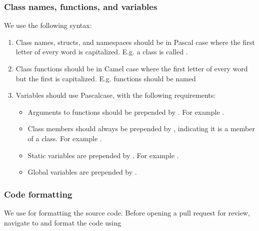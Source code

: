 \documentclass[letterpaper,10pt,english]{sphinxmanual}
\begin{document}
\subsubsection{Class names, functions, and variables}
\label{\detokenize{Contrib/CodeStandard:class-names-functions-and-variables}}
We use the following syntax:
\begin{enumerate}
%
\item {} 
Class names, structs, and namespaces should be in Pascal case where the first letter of every word is capitalized.
E.g. a class is called .

\item {} 
Class functions should be in Camel case where the first letter of every word but the first is capitalized.
E.g. functions should be named 

\item {} 
Variables should use Pascal\sphinxhyphen{}case, with the following requirements:
\begin{itemize}
\item {} 
Arguments to functions should be prepended by . For example .

\item {} 
Class members should always be prepended by , indicating it is a member of a class. For example .

\item {} 
Static variables are prepended by . For example .

\item {} 
Global variables are prepended by \sphinxcode{\sphinxupquote{//}}.

\end{itemize}

\end{enumerate}


\subsubsection{Code formatting}
\label{\detokenize{Contrib/CodeStandard:code-formatting}}
We use  for formatting the source code.
Before opening a pull request for review, navigate to  and format the code using
\end{document}
